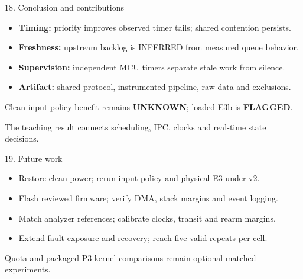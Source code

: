 \begin{frame}[t]{18. Conclusion and contributions}
\begin{itemize}
\item \textbf{Timing:} priority improves observed timer tails; shared contention persists.
\item \textbf{Freshness:} upstream backlog is INFERRED from measured queue behavior.
\item \textbf{Supervision:} independent MCU timers separate stale work from silence.
\item \textbf{Artifact:} shared protocol, instrumented pipeline, raw data and exclusions.
\end{itemize}
\bigskip
Clean input-policy benefit remains \textbf{UNKNOWN}; loaded E3b is \textbf{FLAGGED}.\par\medskip
The teaching result connects scheduling, IPC, clocks and real-time state decisions.
\end{frame}

\begin{frame}[t]{19. Future work}
\begin{itemize}
\item Restore clean power; rerun input-policy and physical E3 under v2.
\item Flash reviewed firmware; verify DMA, stack margins and event logging.
\item Match analyzer references; calibrate clocks, transit and rearm margins.
\item Extend fault exposure and recovery; reach five valid repeats per cell.
\end{itemize}
\bigskip
Quota and packaged P3 kernel comparisons remain optional matched experiments.
\end{frame}

